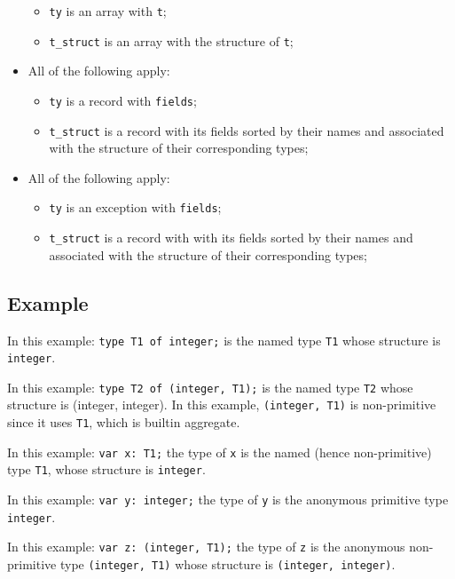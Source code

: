 \documentclass{book}
\begin{document}
\begin{itemize}
      \begin{itemize}
      \item \texttt{ty} is an array with \texttt{t};
      \item \texttt{t\_struct} is an array with the structure of \texttt{t};
      \end{itemize}
    \item All of the following apply:
      \begin{itemize}
      \item \texttt{ty} is a record with \texttt{fields};
      \item \texttt{t\_struct} is a record with its fields sorted by their names and associated with the structure of their corresponding types;
      \end{itemize}
    \item All of the following apply:
      \begin{itemize}
      \item \texttt{ty} is an exception with \texttt{fields};
      \item \texttt{t\_struct} is a record with with its fields sorted by their names and associated with the structure of their corresponding types;
      \end{itemize}
    \end{itemize}
      
    \subsection{Example}
    In this example:
    \texttt{type T1 of integer;} is the named type \texttt{T1}
whose structure is \texttt{integer}.

    In this example:
    \texttt{type T2 of (integer, T1);}
    is the named type \texttt{T2} whose structure is (integer, integer). In this
    example, \texttt{(integer, T1)} is non-primitive since it uses \texttt{T1}, which is builtin aggregate.

    In this example:
    \texttt{var x: T1;}
    the type of \texttt{x} is the named (hence non-primitive) type \texttt{T1}, whose structure
    is \texttt{integer}.

    In this example:
    \texttt{var y: integer;}
    the type of \texttt{y} is the anonymous primitive type \texttt{integer}.

    In this example:
    \texttt{var z: (integer, T1);}
    the type of \texttt{z} is the anonymous non-primitive type
\texttt{(integer, T1)} whose structure is \texttt{(integer, integer)}.
\end{document}
